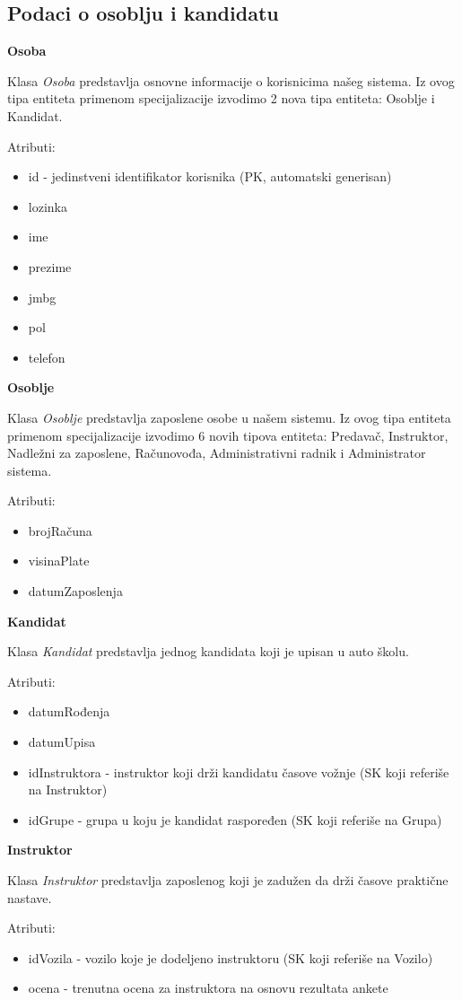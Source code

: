 \subsection{Podaci o osoblju i kandidatu}

\textbf{\large Osoba}
\vspace{0.3cm}

Klasa \textit{Osoba} predstavlja osnovne informacije o korisnicima našeg sistema. 
Iz ovog tipa entiteta primenom specijalizacije izvodimo 2 nova tipa entiteta: Osoblje i Kandidat.

Atributi:
\begin{itemize}
    \item id - jedinstveni identifikator korisnika (PK, automatski generisan)
    \item lozinka 
    \item ime
    \item prezime
    \item jmbg
    \item pol
    \item telefon
\end{itemize}

\textbf{\large Osoblje}
\vspace{0.3cm}

Klasa \textit{Osoblje} predstavlja zaposlene osobe u našem sistemu.
Iz ovog tipa entiteta primenom specijalizacije izvodimo 6 novih tipova entiteta: 
Predavač, Instruktor, Nadležni za zaposlene, Računovođa, Administrativni radnik i Administrator sistema.

Atributi:
\begin{itemize}
    \item brojRačuna
    \item visinaPlate
    \item datumZaposlenja
\end{itemize}

\textbf{\large Kandidat}
\vspace{0.3cm}

Klasa \textit{Kandidat} predstavlja jednog kandidata koji je upisan u auto školu.

Atributi:
\begin{itemize}
    \item datumRođenja
    \item datumUpisa
    \item idInstruktora - instruktor koji drži kandidatu časove vožnje (SK koji referiše na Instruktor)
    \item idGrupe - grupa u koju je kandidat raspoređen (SK koji referiše na Grupa)
\end{itemize}


\textbf{\large Instruktor}
\vspace{0.3cm}

Klasa \textit{Instruktor} predstavlja zaposlenog koji je zadužen da drži časove praktične nastave.

Atributi:
\begin{itemize}
    \item idVozila - vozilo koje je dodeljeno instruktoru (SK koji referiše na Vozilo)
    \item ocena - trenutna ocena za instruktora na osnovu rezultata ankete
\end{itemize}
